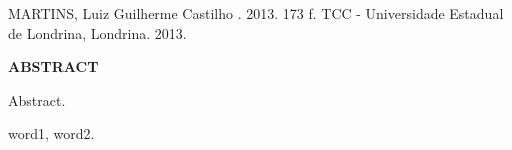 
\newpage 
\singlespacing 

\noindent MARTINS, Luiz Guilherme Castilho {\bf \titulotccen}.  
2013. 173 f. TCC - Universidade Estadual de Londrina, Londrina. 2013. \\

\begin{center} 
        {\bf {\Large ABSTRACT}} 
\end{center}

\noindent Abstract.  
\newline

  word1, word2.
